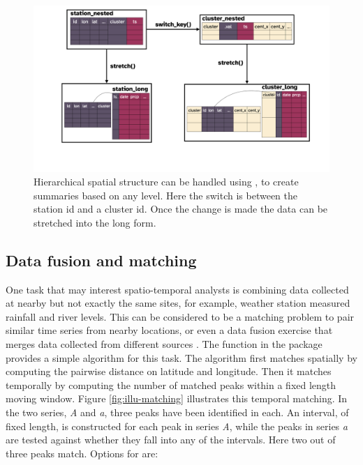 \documentclass[
  shortnames]{jss}
\begin{document}
\begin{CodeChunk}
\begin{figure}

{\centering \includegraphics[width=1\linewidth,height=0.4\textheight]{../figures/diagram-keynotes/diagram-keynotes.003} 

}

\caption[Hierarchical spatial structure can be handled using , to create summaries based on any level]{Hierarchical spatial structure can be handled using , to create summaries based on any level. Here the switch is between the station id and a cluster id. Once the change is made the data can be stretched into the long form.}\label{fig:illu-hier}
\end{figure}
\end{CodeChunk}

\hypertarget{matching}{%
\subsection{Data fusion and matching}\label{matching}}

One task that may interest spatio-temporal analysts is combining data collected at nearby but not exactly the same sites, for example, weather station measured rainfall and river levels. This can be considered to be a matching problem \citep{stuart2010matching, mcintosh2018using} to pair similar time series from nearby locations, or even a data fusion exercise that merges data collected from different sources \citep{cocchi2019data}. The function  in the  package provides a simple algorithm for this task. The algorithm first matches spatially by computing the pairwise distance on latitude and longitude. Then it matches temporally by computing the number of matched peaks within a fixed length moving window. Figure \ref{fig:illu-matching} illustrates this temporal matching. In the two series, \emph{A} and \emph{a}, three peaks have been identified in each. An interval, of fixed length, is constructed for each peak in series \emph{A}, while the peaks in series \emph{a} are tested against whether they fall into any of the intervals. Here two out of three peaks match. Options for  are:
\end{document}
